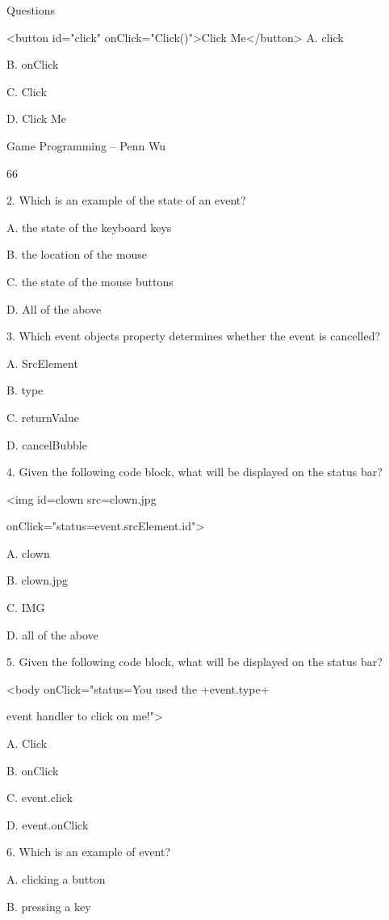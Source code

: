 \documentclass[
]{article}
\begin{document}
Questions

\textless button id="click" onClick="Click()"\textgreater Click
Me\textless/button\textgreater{} A. click

B. onClick

C. Click

D. Click Me

Game Programming -- Penn Wu

66

\protect\hypertarget{index_split_005.htmlux5cux23p67}{}{}

2. Which is an example of the state of an event?

A. the state of the keyboard keys

B. the location of the mouse

C. the state of the mouse buttons

D. All of the above

3. Which event object\textquotesingle s property determines whether the
event is cancelled?

A. SrcElement

B. type

C. returnValue

D. cancelBubble

4. Given the following code block, what will be displayed on the status
bar?

\textless img id=\textquotesingle clown\textquotesingle{}
src=\textquotesingle clown.jpg\textquotesingle{}

onClick="status=event.srcElement.id"\textgreater{}

A. clown

B. clown.jpg

C. IMG

D. all of the above

5. Given the following code block, what will be displayed on the status
bar?

\textless body onClick="status=\textquotesingle You used the
\textquotesingle+event.type+\textquotesingle{}

event handler to click on me!\textquotesingle"\textgreater{}

A. Click

B. onClick

C. event.click

D. event.onClick

6. Which is an example of event?

A. clicking a button

B. pressing a key
\end{document}
